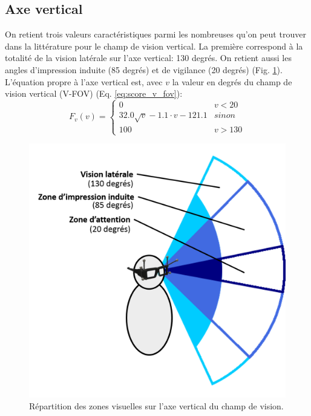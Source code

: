 	\subsection{Axe vertical}
	\par On retient trois valeurs caractéristiques parmi les nombreuses qu'on peut trouver dans la littérature pour le champ de vision vertical. La première correspond à la totalité de la vision latérale sur l'axe vertical: 130 degrés. On retient aussi les angles d'impression induite (85 degrés) et de vigilance (20 degrés) \citep{langlois_adas_2013} (Fig. \ref{fig:champ_vision_vertical}). L'équation propre à l'axe vertical est, avec $v$ la valeur en degrés du champ de vision vertical (V-FOV) (Eq. \ref{eq:score_v_fov}): 
	\begin{equation}
	F_v(v) = \begin{cases}
	0 & v < 20\\
	32.0 \sqrt{v} -1.1 \cdot v -121.1 & sinon\\
	100 & v > 130
	\end{cases}
	\label{eq:score_v_fov}
	\end{equation}
	
	\begin{figure}[h]
		\centering
		\includegraphics[scale=.6]{Figures/ChampVisionVertical}
		\caption{Répartition des zones visuelles sur l'axe vertical du champ de vision.}
		\label{fig:champ_vision_vertical}
	\end{figure}
	
